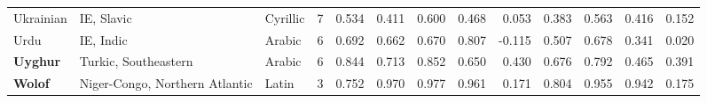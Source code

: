 \begin{tabular}{lllrrrrrrrrrr}
              Ukrainian &                      IE, Slavic &   Cyrillic &         7 &                       0.534 &                         0.411 &         0.600 &                  0.468 &            0.053 &                         0.383 &         0.563 &                  0.416 &            0.152 \\
                   Urdu &                       IE, Indic &     Arabic &         6 &                       0.692 &                         0.662 &         0.670 &                  0.807 &           -0.115 &                         0.507 &         0.678 &                  0.341 &            0.020 \\
        \textbf{Uyghur} &            Turkic, Southeastern &     Arabic &         6 &                       0.844 &                         0.713 &         0.852 &                  0.650 &            0.430 &                         0.676 &         0.792 &                  0.465 &            0.391 \\
         \textbf{Wolof} &  Niger-Congo, Northern Atlantic &      Latin &         3 &                       0.752 &                         0.970 &         0.977 &                  0.961 &            0.171 &                         0.804 &         0.955 &                  0.942 &            0.175 \\
\bottomrule
\end{tabular}
